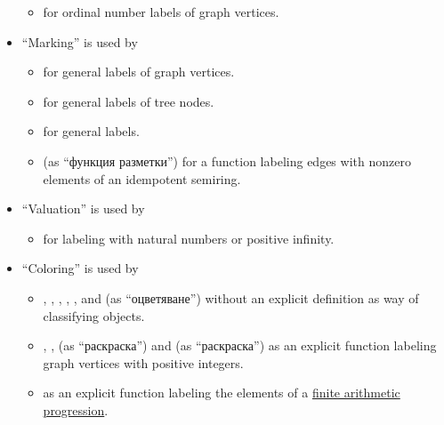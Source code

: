 \begin{remark}
\begin{itemize}
\begin{itemize}
      \item {} for ordinal number labels of graph vertices.
    \end{itemize}

    \item \enquote{Marking} is used by
    \begin{itemize}
      \item {} for general labels of graph vertices.

      \item {} for general labels of tree nodes.

      \item {} for general labels.

      \item {} (as \enquote{функция разметки}) for a function labeling edges with nonzero elements of an idempotent semiring.
    \end{itemize}

    \item \enquote{Valuation} is used by
    \begin{itemize}
      \item {} for labeling with natural numbers or positive infinity.
    \end{itemize}

    \item \enquote{Coloring} is used by
    \begin{itemize}
      \item {}, , , , ,  and  (as \enquote{оцветяване}) without an explicit definition as way of classifying objects.

      \item {}, ,  (as \enquote{раскраска}) and  (as \enquote{раскраска}) as an explicit function labeling graph vertices with positive integers.

      \item {} as an explicit function labeling the elements of a \hyperref[def:arithmetic_progression]{finite arithmetic progression}.


\end{itemize}
\end{itemize}
\end{remark}

